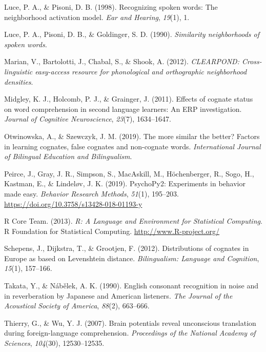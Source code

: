 \documentclass[
]{article}
\newlength{\cslhangindent}
\newenvironment{CSLReferences}[2] %
 {\begin{list}{}{%
  \setlength{\itemindent}{0pt}
  \setlength{\leftmargin}{0pt}
  \setlength{\parsep}{0pt}
  \ifodd #1
   \setlength{\leftmargin}{\cslhangindent}
   \setlength{\itemindent}{-1\cslhangindent}
  \fi
  \setlength{\itemsep}{#2\baselineskip}}}
 {\end{list}}
\begin{document}
\begin{CSLReferences}{1}{0}
Luce, P. A., \& Pisoni, D. B. (1998). Recognizing spoken words: {The}
neighborhood activation model. \emph{Ear and Hearing}, \emph{19}(1), 1.

Luce, P. A., Pisoni, D. B., \& Goldinger, S. D. (1990). \emph{Similarity
neighborhoods of spoken words.}

Marian, V., Bartolotti, J., Chabal, S., \& Shook, A. (2012).
\emph{{CLEARPOND}: {Cross-linguistic} easy-access resource for
phonological and orthographic neighborhood densities}.

Midgley, K. J., Holcomb, P. J., \& Grainger, J. (2011). Effects of
cognate status on word comprehension in second language learners: {An
ERP} investigation. \emph{Journal of Cognitive Neuroscience},
\emph{23}(7), 1634--1647.

Otwinowska, A., \& Szewczyk, J. M. (2019). The more similar the better?
Factors in learning cognates, false cognates and non-cognate words.
\emph{International Journal of Bilingual Education and Bilingualism}.

Peirce, J., Gray, J. R., Simpson, S., MacAskill, M., Höchenberger, R.,
Sogo, H., Kastman, E., \& Lindeløv, J. K. (2019). {PsychoPy2}:
{Experiments} in behavior made easy. \emph{Behavior Research Methods},
\emph{51}(1), 195--203. \url{https://doi.org/10.3758/s13428-018-01193-y}

R Core Team. (2013). \emph{R: {A Language} and {Environment} for
{Statistical Computing}}. R Foundation for Statistical Computing.
\url{http://www.R-project.org/}

Schepens, J., Dijkstra, T., \& Grootjen, F. (2012). Distributions of
cognates in {Europe} as based on {Levenshtein} distance.
\emph{Bilingualism: Language and Cognition}, \emph{15}(1), 157--166.

Takata, Y., \& Nábělek, A. K. (1990). English consonant recognition in
noise and in reverberation by {Japanese} and {American} listeners.
\emph{The Journal of the Acoustical Society of America}, \emph{88}(2),
663--666.

Thierry, G., \& Wu, Y. J. (2007). Brain potentials reveal unconscious
translation during foreign-language comprehension. \emph{Proceedings of
the National Academy of Sciences}, \emph{104}(30), 12530--12535.


\end{CSLReferences}
\end{document}
